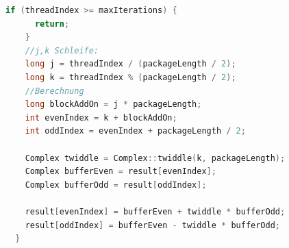 \documentclass[a4paper,12pt]{article}
\theoremstyle{definition}
\theoremstyle{remark}
\begin{document}
\begin{lstlisting}[style=mystyle, language=C++, caption={FFT auf der GPU mit CUDA}]
    if (threadIndex >= maxIterations) {
      return;
    }
    //j,k Schleife: 
    long j = threadIndex / (packageLength / 2);
    long k = threadIndex % (packageLength / 2);
    //Berechnung
    long blockAddOn = j * packageLength;
    int evenIndex = k + blockAddOn;
    int oddIndex = evenIndex + packageLength / 2;

    Complex twiddle = Complex::twiddle(k, packageLength); 
    Complex bufferEven = result[evenIndex];
    Complex bufferOdd = result[oddIndex];
    
    result[evenIndex] = bufferEven + twiddle * bufferOdd;
    result[oddIndex] = bufferEven - twiddle * bufferOdd;
  }
\end{lstlisting}
\end{document}
